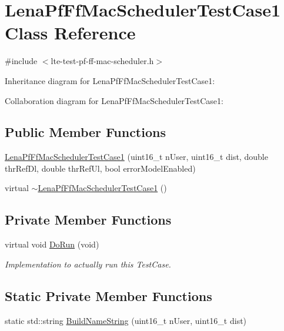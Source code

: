 \hypertarget{classLenaPfFfMacSchedulerTestCase1}{}\section{Lena\+Pf\+Ff\+Mac\+Scheduler\+Test\+Case1 Class Reference}
\label{classLenaPfFfMacSchedulerTestCase1}


{\ttfamily \#include $<$lte-\/test-\/pf-\/ff-\/mac-\/scheduler.\+h$>$}



Inheritance diagram for Lena\+Pf\+Ff\+Mac\+Scheduler\+Test\+Case1\+:


Collaboration diagram for Lena\+Pf\+Ff\+Mac\+Scheduler\+Test\+Case1\+:
\subsection*{Public Member Functions}
\begin{DoxyCompactItemize}
\item 
\hyperlink{classLenaPfFfMacSchedulerTestCase1_a0e27ec373e8974cc1a17910947136c6d}{Lena\+Pf\+Ff\+Mac\+Scheduler\+Test\+Case1} (uint16\+\_\+t n\+User, uint16\+\_\+t dist, double thr\+Ref\+Dl, double thr\+Ref\+Ul, bool error\+Model\+Enabled)
\item 
virtual \hyperlink{classLenaPfFfMacSchedulerTestCase1_a71f460d5fe04d0dc1023014c1415ac1b}{$\sim$\+Lena\+Pf\+Ff\+Mac\+Scheduler\+Test\+Case1} ()
\end{DoxyCompactItemize}
\subsection*{Private Member Functions}
\begin{DoxyCompactItemize}
\item 
virtual void \hyperlink{classLenaPfFfMacSchedulerTestCase1_a34e366045d568d5a38bedfeebbf72b79}{Do\+Run} (void)
\begin{DoxyCompactList}\small\item\em Implementation to actually run this Test\+Case. \end{DoxyCompactList}\end{DoxyCompactItemize}
\subsection*{Static Private Member Functions}
\begin{DoxyCompactItemize}
\item 
static std\+::string \hyperlink{classLenaPfFfMacSchedulerTestCase1_aeefe0935c5137cce1bfa9acb1ff85aec}{Build\+Name\+String} (uint16\+\_\+t n\+User, uint16\+\_\+t dist)
\end{DoxyCompactItemize}
